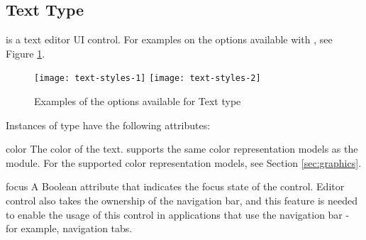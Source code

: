 \subsection{Text Type}
\label{subsec:mylabel5}
 is a text editor UI control. For examples on the options 
available with , see Figure \ref{fig:text-styles}.

\begin{figure}[htbp]
\centering
\texttt{[image: text-styles-1]}
\texttt{[image: text-styles-2]}
\caption{Examples of the options available for Text type}
\label{fig:text-styles}
\end{figure}

Instances of  type have the following attributes:

\begin{memberdesc}[Text]{color}
The color of the text.  supports the same color representation 
models as the  module. For the supported color 
representation models, see Section \ref{sec:graphics}.
\end{memberdesc}

\begin{memberdesc}[Text]{focus}
A Boolean attribute that indicates the focus state of the control. Editor 
control also takes the ownership of the navigation bar, and this feature is 
needed to enable the usage of this control in applications that use the 
navigation bar - for example, navigation tabs.
\end{memberdesc}

